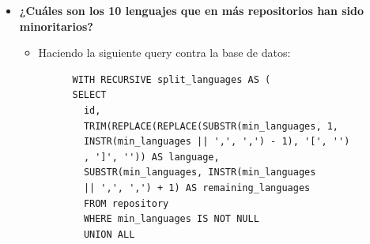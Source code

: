 \documentclass[a4paper, 12pt]{book}
\begin{document}
\begin{itemize}
\begin{itemize}
        \end{itemize}
  \item \textbf{¿Cuáles son los 10 lenguajes que en más repositorios han sido minoritarios?}
        \begin{itemize}
          \item Haciendo la siguiente query contra la base de datos:
                \begin{verbatim}
      WITH RECURSIVE split_languages AS (
      SELECT 
        id,
        TRIM(REPLACE(REPLACE(SUBSTR(min_languages, 1, 
        INSTR(min_languages || ',', ',') - 1), '[', '')
        , ']', '')) AS language,
        SUBSTR(min_languages, INSTR(min_languages 
        || ',', ',') + 1) AS remaining_languages
        FROM repository
        WHERE min_languages IS NOT NULL
        UNION ALL


\end{verbatim}
\end{itemize}
\end{itemize}
\end{document}
